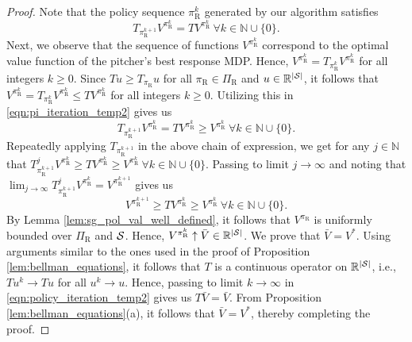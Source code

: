 \documentclass[11pt]{article}
\newcommand{\abs}[1]{\left\lvert#1\right\rvert}
\begin{document}
\begin{proof}
           Note that the policy sequence $\pi_\text{R}^k$ generated by our algorithm satisfies  
           \begingroup
           \allowdisplaybreaks
           \begin{equation}
           \label{eqn:pi_iteration_temp2}
           T_{\pi_\text{R}^{k+1}}V^{\pi_\text{R}^k} = TV^{\pi_\text{R}^k} \ \forall k \in \mathbb{N} \cup \{0\}.
           \end{equation}
           \endgroup
           Next, we observe that the sequence of functions $V^{\pi_\text{R}^k}$ correspond to the optimal value function of the pitcher's best response MDP. Hence, $V^{\pi_\text{R}^k} = T_{\pi_\text{R}^k} V^{\pi_\text{R}^k}$ for all integers $k \geq 0$. Since $Tu \geq T_{\pi_\text{R}}u$ for all $\pi_\text{R} \in \Pi_\text{R}$ and $u \in \mathbb{R}^{\abs{\cal S}}$, it follows that $V^{\pi_\text{R}^k} = T_{\pi_\text{R}^k} V^{\pi_\text{R}^k} \leq T V^{\pi_\text{R}^k}$ for all integers $k \geq 0$. Utilizing this in \eqref{eqn:pi_iteration_temp2} gives us
           \begingroup
           \allowdisplaybreaks
           \[
               T_{\pi_\text{R}^{k+1}}V^{\pi_\text{R}^k} = TV^{\pi_\text{R}^k} \geq V^{\pi_\text{R}^k} \ \forall k \in \mathbb{N} \cup \{0\}.
           \]
           \endgroup
           Repeatedly applying $T_{\pi_\text{R}^{k+1}}$ in the above chain of expression, we get for any $j \in \mathbb{N}$ that $T_{\pi_\text{R}^{k+1}}^j V^{\pi_\text{R}^k} \geq TV^{\pi_\text{R}^k} \geq V^{\pi_\text{R}^k} \ \forall k \in \mathbb{N} \cup \{0\}$. Passing to limit $j \to \infty$ and noting that $\lim_{j \to \infty}T_{\pi_\text{R}^{k+1}}^j V^{\pi_\text{R}^k} = V^{\pi_\text{R}^{k+1}}$ gives us
           \begingroup
           \allowdisplaybreaks
           \begin{equation}
           \label{eqn:policy_iteration_temp2}
               V^{\pi_\text{R}^{k+1}} \geq TV^{\pi_\text{R}^k} \geq V^{\pi_\text{R}^k} \ \forall k \in \mathbb{N} \cup \{0\}.
           \end{equation}
           \endgroup
           By Lemma  \ref{lem:sg_pol_val_well_defined}, it follows that $V^{\pi_\text{R}}$ is uniformly bounded over $\Pi_\text{R}$ and ${\cal S}$. Hence, $V^{\pi_\text{R}^k} \uparrow \bar V \in \mathbb{R}^{\abs{\cal S}}$. We prove that $\bar V = V^*$. Using arguments similar to the ones used in the proof of Proposition  \ref{lem:bellman_equations}, it follows that $T$ is a  continuous operator on $\mathbb{R}^{\abs{\cal S}}$, i.e., $T u^k \to T u$ for all $u^k \to u$. Hence, passing to limit $k \to \infty$ in \eqref{eqn:policy_iteration_temp2} gives us $T \bar V = \bar V$. From Proposition  \ref{lem:bellman_equations}(a), it follows that $\bar V = V^*$, thereby completing the proof.
       \end{proof}
    
\end{document}
